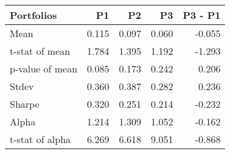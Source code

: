\begin{tabular}{lrrrr}
\toprule
Portfolios & P1 & P2 & P3 & P3 - P1 \\
\midrule
Mean & 0.115 & 0.097 & 0.060 & -0.055 \\
t-stat of mean & 1.784 & 1.395 & 1.192 & -1.293 \\
p-value of mean & 0.085 & 0.173 & 0.242 & 0.206 \\
Stdev & 0.360 & 0.387 & 0.282 & 0.236 \\
Sharpe & 0.320 & 0.251 & 0.214 & -0.232 \\
Alpha & 1.214 & 1.309 & 1.052 & -0.162 \\
t-stat of alpha & 6.269 & 6.618 & 9.051 & -0.868 \\
\bottomrule
\end{tabular}
